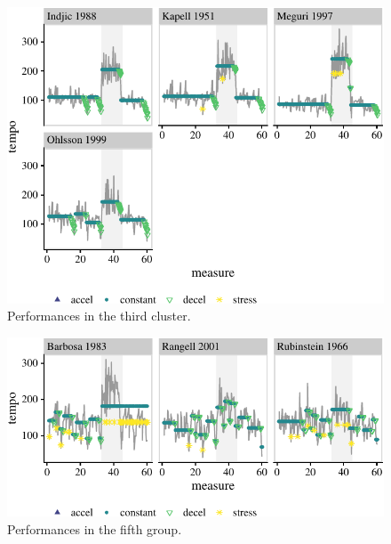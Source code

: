 \documentclass[aoas]{imsart}
\begin{document}
\begin{figure}

{\centering \includegraphics{gfx/clust-3-1} 

}

\caption{Performances in the third cluster.}\label{fig:clust-3}
\end{figure}

\begin{figure}

{\centering \includegraphics{gfx/clust-5-1} 

}

\caption{Performances in the fifth group.}\label{fig:clust-5}
\end{figure}
\end{document}
